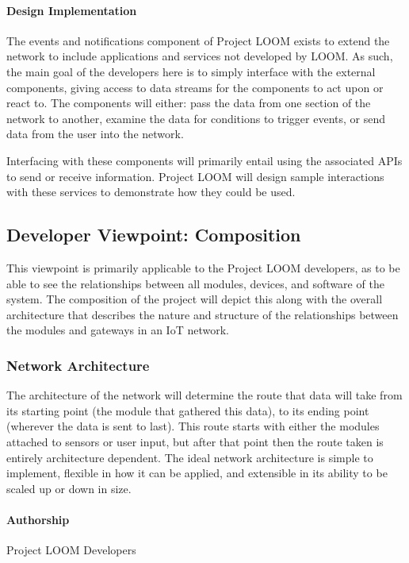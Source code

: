 \documentclass[onecolumn, draftclsnofoot,10pt, compsoc]{IEEEtran}
\begin{document}
\paragraph{Design Implementation}
    The events and notifications component of Project LOOM exists to extend the network to include applications and services not developed by LOOM. As such, the main goal of the developers here is to simply interface with the external components, giving access to data streams for the components to act upon or react to. The components will either: pass the data from one section of the network to another, examine the data for conditions to trigger events, or send data from the user into the network.

    Interfacing with these components will primarily entail using the associated APIs to send or receive information. Project LOOM will design sample interactions with these services to demonstrate how they could be used.






\subsection{Developer Viewpoint: Composition}
    This viewpoint is primarily applicable to the Project LOOM developers, as to be able to see the relationships between all modules, devices, and software of the system. The composition of the project will depict this along with the overall architecture that describes the nature and structure of the relationships between the modules and gateways in an IoT network.

\subsubsection{Network Architecture}
    The architecture of the network will determine the route that data will take from its starting point (the module that gathered this data), to its ending point (wherever the data is sent to last). This route starts with either the modules attached to sensors or user input, but after that point then the route taken is entirely architecture dependent. The ideal network architecture is simple to implement, flexible in how it can be applied, and extensible in its ability to be scaled up or down in size. 

\paragraph{Authorship}
    Project LOOM Developers
\end{document}
